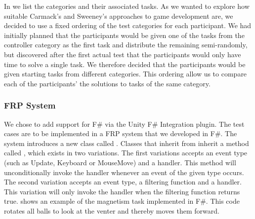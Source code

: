 

 In  we list the categories and their associated tasks. As we wanted to explore how suitable Carmack's and Sweeney's approaches to game development are, we decided to use a fixed ordering of the test categories for each participant. We had initially planned that the participants would be given one of the tasks from the controller category as the first task and distribute the remaining semi-randomly, but discovered after the first actual test that the participants would only have time to solve a single task. We therefore decided that the participants would be given starting tasks from different categories. This ordering allow us to compare each of the participants' the solutions to tasks of the same category.

\subsubsection{FRP System}\label{sec:frp-sys}
We chose to add support for F\# via the Unity F\# Integration plugin\cite{fsharp2019plugin}. The test cases are to be implemented in a \gls{FRP} system that we developed in F\#. The  system introduces a new class called . Classes that inherit from  inherit a method called , which exists in two variations. The first variations accepts an event type (such as Update, Keyboard or MouseMove) and a handler. This method will unconditionally invoke the handler whenever an event of the given type occurs. The second variation accepts an event type, a filtering function and a handler. This variation will only invoke the handler when the filtering function returns true.  shows an example of the magnetism task implemented in F\#. This code rotates all balls to look at the venter and thereby moves them forward.

